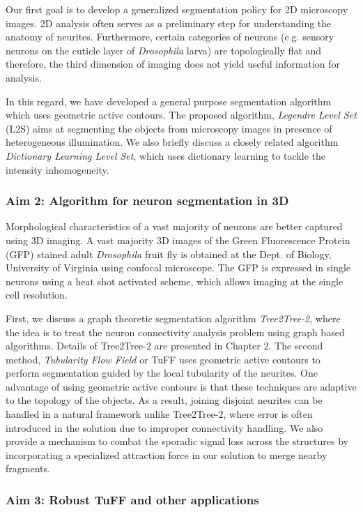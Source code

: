 Our first goal is to develop a generalized segmentation policy for  2D microscopy images. 2D analysis often serves as a preliminary step for understanding the anatomy of neurites. Furthermore, certain categories of neurons (e.g. sensory neurons on the cuticle layer of \textit{Drosophila} larva) are topologically flat and therefore, the third dimension of imaging does not yield useful information for analysis. 

In this regard, we have developed a general purpose segmentation algorithm which uses geometric active contours. The proposed algorithm, \textit{Legendre Level Set} (L2S) aims at segmenting the objects from microscopy images in presence of heterogeneous illumination. We also briefly discuss a closely related algorithm \textit{Dictionary Learning Level Set}, which uses dictionary learning to tackle the intensity inhomogeneity. 

\subsubsection*{Aim 2: Algorithm for neuron segmentation in 3D}
Morphological characteristics of a vast majority of neurons are better captured using 3D imaging. A vast majority 3D images of the Green Fluorescence Protein (GFP) stained adult \textit{Drosophila} fruit fly is obtained at the Dept. of Biology, University of Virginia using confocal microscope. The GFP is expressed in single neurons using a heat shot activated scheme, which allows imaging at the single cell resolution\cite{barry_branching}.

First, we discuss a graph theoretic segmentation algorithm \textit{Tree2Tree-2}, where the idea is to treat the neuron connectivity analysis problem using graph based algorithms. Details of Tree2Tree-2 are presented in Chapter 2. The second method, \textit{Tubularity Flow Field} or TuFF uses geometric active contours to perform segmentation guided by the local tubularity of the neurites. One advantage of using geometric active contours is that these techniques are adaptive to the topology of the objects. As a result, joining disjoint neurites can be handled in a natural framework unlike Tree2Tree-2, where error is often introduced in the solution due to improper connectivity handling. We also provide a mechanism to combat the sporadic signal loss across the structures by incorporating a specialized attraction force in our solution to merge nearby fragments. 

\subsubsection*{Aim 3: Robust TuFF and other applications}

